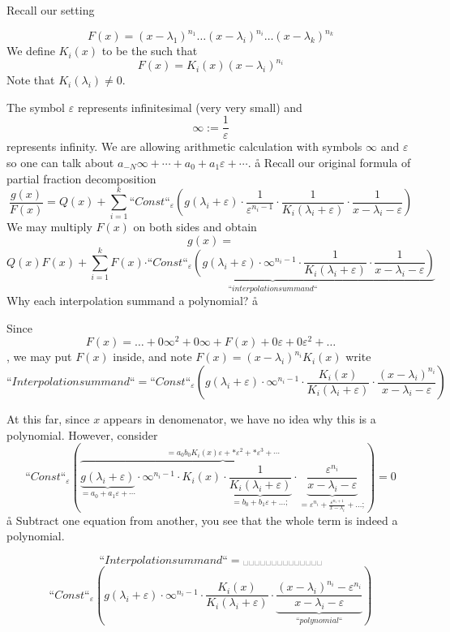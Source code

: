 
\def\1{\y1}
\def\2{\y2}
\def\3{\y3}
\def\4{\y4}
\def\5{\y5}
\def\6{\y6}
\def\7{\y7}
\def\8{\y8}
\def\9{\y9}
\def\0{\y0}
\def\-{\y-}
Recall our setting

$$
F(x)=(x-λ_1)^{n_1}…(x-λ_i)^{n_i}…(x-λ_k)^{n_k}
$$
We define $K_i(x)$ to be the  such that
$$
F(x)=K_i(x)(x-λ_i)^{n_i}
$$
Note that $K_i(λ_i)≠0$.

The symbol $ε$ represents infinitesimal (very very small) and 
$$
∞ := \frac1{ε}
$$
represents infinity.  We are allowing arithmetic calculation with symbols $∞$ and $ε$ so one can talk about $a_{-N}∞+\cdots+a_0+a_1ε+\cdots$.
\a\aa
Recall our original formula of partial fraction decomposition
$$
\frac{g(x)}{F(x)}=Q(x) + ∑_{i=1}^k“Const“_ε\left(g(λ_i+ε)·\frac1{ε^{n_i-1}}·\frac1{K_i(λ_i+ε)}·\frac1{x-λ_i-ε}\right)
$$
We may multiply $F(x)$ on both sides and obtain
$$
g(x)=
$$
$$Q(x)F(x) + ∑_{i=1}^k \underbrace{F(x)·“Const“_ε\left(g(λ_i+ε)·{∞^{n_i-1}}·\frac1{K_i(λ_i+ε)}·\frac1{x-λ_i-ε}\right)}_{“interpolation summand“}
$$
Why each interpolation summand a polynomial?
\a\aa

Since $$F(x)=…+0∞^2+0∞+F(x)+0ε+0ε^2+…$$, we may put $F(x)$ inside, and note $F(x)=(x-λ_i)^{n_i}K_i(x)$ write
$$
“Interpolation summand“=“Const“_ε\left(g(λ_i+ε)·{∞^{n_i-1}}·\frac{K_i(x)}{K_i(λ_i+ε)}·\frac{(x-λ_i)^{n_i}}{x-λ_i-ε}\right)
$$

At this far, since $x$ appears in denomenator, we have no idea why this is a polynomial. 
\vfill
However, consider
$$
“Const“_ε\left(
\overbrace{
\underbrace{g(λ_i+ε)}_{=a_0+a_1ε+\cdots}·{∞^{n_i-1}}·K_i(x)·\underbrace{\frac{1}{K_i(λ_i+ε)}}_{=b_0+b_1ε+…;}·\underbrace{\frac{ε^{n_i}}{x-λ_i-ε}}_{=ε^{n_i}+\frac{ε^{n_i+1}}{x-λ_i}+…;}
}^{=a_0b_0K_i(x)ε+*ε^2+*ε^3+\cdots}\right)
=0
$$
\a\aa
Subtract one equation from another, you see that the whole term is indeed a polynomial.

$$ “Interpolation summand“= ␣ ␣ ␣ ␣ ␣ ␣ ␣ ␣ ␣ ␣ ␣ ␣ ␣ ␣ $$$$ 
“Const“_ε\left(g(λ_i+ε)·{∞^{n_i-1}}·\frac{K_i(x)}{K_i(λ_i+ε)}·\underbrace{\frac{(x-λ_i)^{n_i}-ε^{n_i}}{x-λ_i-ε}}_{“polynomial“}\right)
$$


